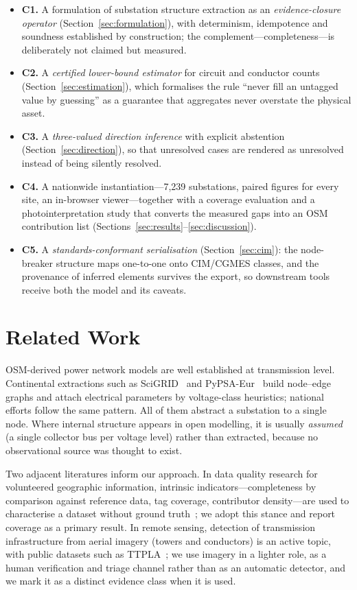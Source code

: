\documentclass[journal]{IEEEtran}
\begin{document}
\begin{itemize}
\item \textbf{C1.} A formulation of substation structure extraction as an
      \emph{evidence-closure operator} (Section~\ref{sec:formulation}), with
      determinism, idempotence and soundness established by construction; the
      complement---completeness---is deliberately not claimed but measured.
\item \textbf{C2.} A \emph{certified lower-bound estimator} for circuit and
      conductor counts (Section~\ref{sec:estimation}), which formalises the rule
      ``never fill an untagged value by guessing'' as a guarantee that aggregates
      never overstate the physical asset.
\item \textbf{C3.} A \emph{three-valued direction inference} with explicit
      abstention (Section~\ref{sec:direction}), so that unresolved cases are
      rendered as unresolved instead of being silently resolved.
\item \textbf{C4.} A nationwide instantiation---7{,}239 substations, paired
      figures for every site, an in-browser viewer---together with a coverage
      evaluation and a photointerpretation study that converts the measured gaps
      into an OSM contribution list (Sections~\ref{sec:results}--\ref{sec:discussion}).
\item \textbf{C5.} A \emph{standards-conformant serialisation}
      (Section~\ref{sec:cim}): the node-breaker structure maps one-to-one onto
      CIM/CGMES classes, and the provenance of inferred elements survives the
      export, so downstream tools receive both the model and its caveats.
\end{itemize}

\section{Related Work}

OSM-derived power network models are well established at transmission level.
Continental extractions such as SciGRID~\cite{medjroubi2017} and PyPSA-Eur~\cite{pypsa_eur,xiong2025} build node--edge graphs and
attach electrical parameters by voltage-class heuristics; national efforts
follow the same pattern. All of them abstract a substation to a single node.
Where internal structure appears in open modelling, it is usually \emph{assumed}
(a single collector bus per voltage level) rather than extracted, because no
observational source was thought to exist.

Two adjacent literatures inform our approach. In data quality research for
volunteered geographic information, intrinsic indicators---completeness by
comparison against reference data, tag coverage, contributor density---are used
to characterise a dataset without ground truth~\cite{barron2014}; we adopt this stance and report
coverage as a primary result. In remote sensing, detection of transmission
infrastructure from aerial imagery (towers and conductors) is an active topic,
with public datasets such as TTPLA~\cite{ttpla2020}; we use imagery in a lighter role, as a human
verification and triage channel rather than as an automatic detector, and we
mark it as a distinct evidence class when it is used.
\end{document}
